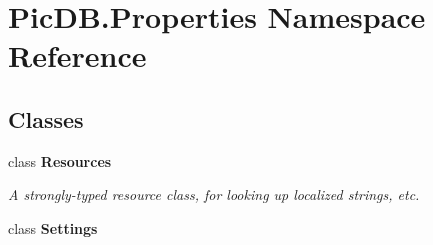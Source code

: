 \hypertarget{namespace_pic_d_b_1_1_properties}{}\section{Pic\+D\+B.\+Properties Namespace Reference}
\label{namespace_pic_d_b_1_1_properties}
\subsection*{Classes}
\begin{DoxyCompactItemize}
\item 
class {\bfseries Resources}
\begin{DoxyCompactList}\small\item\em A strongly-\/typed resource class, for looking up localized strings, etc. \end{DoxyCompactList}\item 
class {\bfseries Settings}
\end{DoxyCompactItemize}
